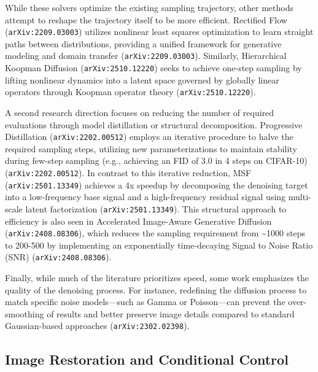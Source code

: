 \documentclass[11pt]{article}
\begin{document}
While these solvers optimize the existing sampling trajectory, other methods attempt to reshape the trajectory itself to be more efficient. Rectified Flow (\texttt{arXiv:2209.03003}) utilizes nonlinear least squares optimization to learn straight paths between distributions, providing a unified framework for generative modeling and domain transfer (\texttt{arXiv:2209.03003}). Similarly, Hierarchical Koopman Diffusion (\texttt{arXiv:2510.12220}) seeks to achieve one-step sampling by lifting nonlinear dynamics into a latent space governed by globally linear operators through Koopman operator theory (\texttt{arXiv:2510.12220}).

A second research direction focuses on reducing the number of required evaluations through model distillation or structural decomposition. Progressive Distillation (\texttt{arXiv:2202.00512}) employs an iterative procedure to halve the required sampling steps, utilizing new parameterizations to maintain stability during few-step sampling (e.g., achieving an FID of 3.0 in 4 steps on CIFAR-10) (\texttt{arXiv:2202.00512}). In contrast to this iterative reduction, MSF (\texttt{arXiv:2501.13349}) achieves a 4x speedup by decomposing the denoising target into a low-frequency base signal and a high-frequency residual signal using multi-scale latent factorization (\texttt{arXiv:2501.13349}). This structural approach to efficiency is also seen in Accelerated Image-Aware Generative Diffusion (\texttt{arXiv:2408.08306}), which reduces the sampling requirement from \textasciitilde{}1000 steps to 200-500 by implementing an exponentially time-decaying Signal to Noise Ratio (SNR) (\texttt{arXiv:2408.08306}).

Finally, while much of the literature prioritizes speed, some work emphasizes the quality of the denoising process. For instance, redefining the diffusion process to match specific noise models—such as Gamma or Poisson—can prevent the over-smoothing of results and better preserve image details compared to standard Gaussian-based approaches (\texttt{arXiv:2302.02398}).

\subsection{Image Restoration and Conditional Control}
\end{document}
